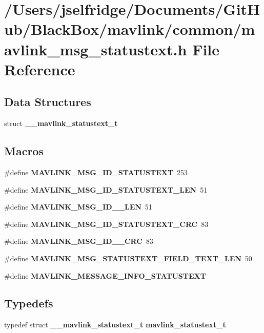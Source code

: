 \section{/\+Users/jselfridge/\+Documents/\+Git\+Hub/\+Black\+Box/mavlink/common/mavlink\+\_\+msg\+\_\+statustext.h File Reference}
\label{mavlink__msg__statustext_8h}
\subsection*{Data Structures}
\begin{DoxyCompactItemize}
\item 
struct \textbf{ \+\_\+\+\_\+mavlink\+\_\+statustext\+\_\+t}
\end{DoxyCompactItemize}
\subsection*{Macros}
\begin{DoxyCompactItemize}
\item 
\#define \textbf{ M\+A\+V\+L\+I\+N\+K\+\_\+\+M\+S\+G\+\_\+\+I\+D\+\_\+\+S\+T\+A\+T\+U\+S\+T\+E\+XT}~253
\item 
\#define \textbf{ M\+A\+V\+L\+I\+N\+K\+\_\+\+M\+S\+G\+\_\+\+I\+D\+\_\+\+S\+T\+A\+T\+U\+S\+T\+E\+X\+T\+\_\+\+L\+EN}~51
\item 
\#define \textbf{ M\+A\+V\+L\+I\+N\+K\+\_\+\+M\+S\+G\+\_\+\+I\+D\+\_\+\_\+\+L\+EN}~51
\item 
\#define \textbf{ M\+A\+V\+L\+I\+N\+K\+\_\+\+M\+S\+G\+\_\+\+I\+D\+\_\+\+S\+T\+A\+T\+U\+S\+T\+E\+X\+T\+\_\+\+C\+RC}~83
\item 
\#define \textbf{ M\+A\+V\+L\+I\+N\+K\+\_\+\+M\+S\+G\+\_\+\+I\+D\+\_\+\_\+\+C\+RC}~83
\item 
\#define \textbf{ M\+A\+V\+L\+I\+N\+K\+\_\+\+M\+S\+G\+\_\+\+S\+T\+A\+T\+U\+S\+T\+E\+X\+T\+\_\+\+F\+I\+E\+L\+D\+\_\+\+T\+E\+X\+T\+\_\+\+L\+EN}~50
\item 
\#define \textbf{ M\+A\+V\+L\+I\+N\+K\+\_\+\+M\+E\+S\+S\+A\+G\+E\+\_\+\+I\+N\+F\+O\+\_\+\+S\+T\+A\+T\+U\+S\+T\+E\+XT}
\end{DoxyCompactItemize}
\subsection*{Typedefs}
\begin{DoxyCompactItemize}
\item 
typedef struct \textbf{ \+\_\+\+\_\+mavlink\+\_\+statustext\+\_\+t} \textbf{ mavlink\+\_\+statustext\+\_\+t}
\end{DoxyCompactItemize}


